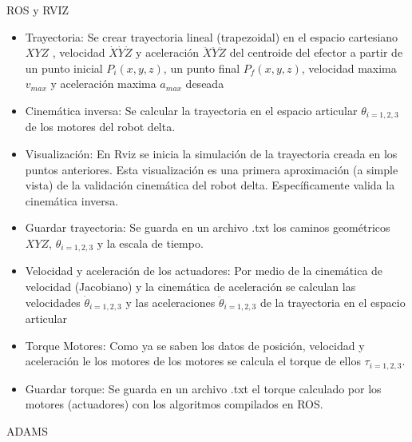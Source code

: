         \item ROS y RVIZ
            \begin{itemize}
                \item {Trayectoria: Se crear trayectoria lineal (trapezoidal) en el espacio cartesiano $XYZ$ , velocidad $\dot{X}\dot{Y}\dot{Z}$ y aceleración $\ddot{X}\ddot{Y}\ddot{Z}$ del centroide del efector a partir de un punto inicial $P_i(x,y,z)$, un punto final $P_f(x,y,z)$, velocidad maxima $v_{max}$ y aceleración maxima $a_{max}$ deseada}
                \item {Cinemática inversa: Se calcular la trayectoria en el espacio articular $\theta_{i=1,2,3}$ de los motores del robot delta.}
                \item {Visualización: En Rviz se inicia la simulación de la trayectoria creada en los puntos anteriores. Esta visualización es una primera aproximación (a simple vista) de la validación cinemática del robot delta. Específicamente valida la cinemática inversa.}
                \item {Guardar trayectoria: Se guarda en un archivo .txt los caminos geométricos  $XYZ$, $\theta_{i=1,2,3}$ y la escala de tiempo.
                }
                \item {Velocidad y aceleración de los actuadores: Por medio de la cinemática de velocidad (Jacobiano) y la cinemática de aceleración se calculan las velocidades $\dot{\theta}_{i=1,2,3}$ y las aceleraciones $\ddot{\theta}_{i=1,2,3}$ de la trayectoria en el espacio articular}
                \item{ Torque Motores: Como ya se saben los datos de posición, velocidad y aceleración le los motores de los motores se calcula el torque de ellos $\tau_{i=1,2,3}$.}
                \item {Guardar torque: Se guarda en un archivo .txt el torque calculado por los motores (actuadores) con los algoritmos compilados en ROS.
                }
            \end{itemize}
        \item ADAMS
